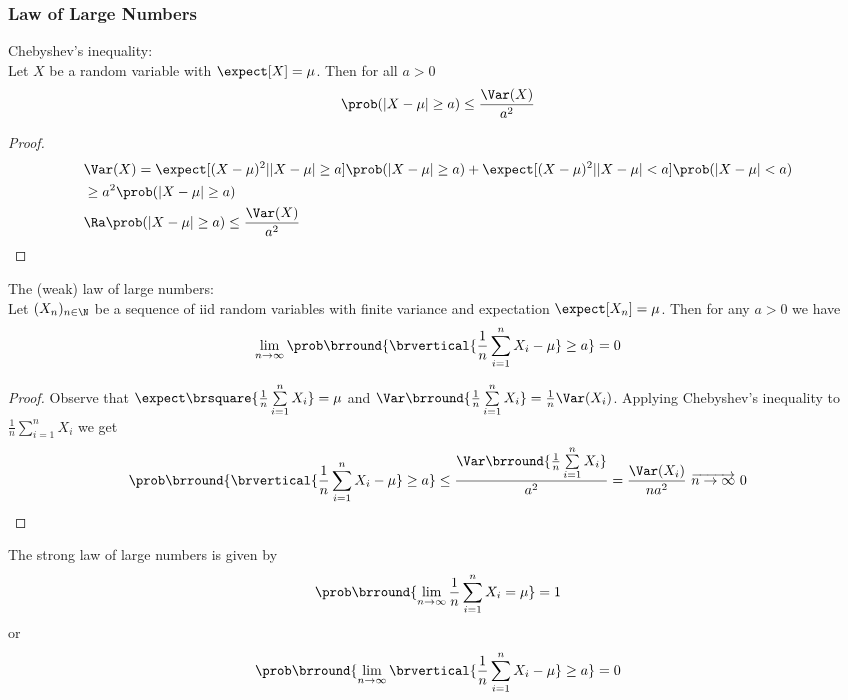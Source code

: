 \subsubsection{Law of Large Numbers}
Chebyshev's inequality:\\
Let $X$ be a random variable with $\expect[X]=\mu$. Then for all $a>0$
\[\prob(|X-\mu|\geq a)\leq\frac{\Var(X)}{a^2}\]
\begin{proof}
\begin{align*}
    &\Var(X)=\expect[(X-\mu)^2||X-\mu|\geq a]\prob(|X-\mu|\geq a) + \expect[(X-\mu)^2||X-\mu|<a]\prob(|X-\mu|<a)\\
    &\geq a^2\prob(|X-\mu|\geq a)\\
    &\Ra \prob(|X-\mu|\geq a)\leq\frac{\Var(X)}{a^2}
\end{align*}
\end{proof}
The (weak) law of large numbers:\\
Let $(X_n)_{n\in\N}$ be a sequence of iid random variables with finite variance and expectation $\expect[X_n]=\mu$. Then for any $a>0$ we have
\[\lim_{n\to\infty}\prob\brround{\brvertical{\frac{1}{n}\sum_{i=1}^n X_i-\mu}\geq a}=0\]
\begin{proof}
Observe that $\expect\brsquare{\frac{1}{n}\sum\limits_{i=1}^nX_i}=\mu$ and $\Var\brround{\frac{1}{n}\sum\limits_{i=1}^n X_i}=\frac{1}{n}\Var(X_i)$. Applying Chebyshev's inequality to $\frac{1}{n}\sum\limits_{i=1}^n X_i$ we get
\[\prob\brround{\brvertical{\frac{1}{n}\sum_{i=1}^n X_i-\mu}\geq a}\leq\frac{\Var\brround{\frac{1}{n}\sum\limits_{i=1}^n X_i}}{a^2}=\frac{\Var(X_i)}{na^2}\ \overrightarrow{n\to\infty}\ 0\]
\end{proof}
The strong law of large numbers is given by
\[\prob\brround{\lim_{n\to\infty}\frac{1}{n}\sum_{i=1}^n X_i=\mu}=1\]
or
\[\prob\brround{\lim_{n\to\infty}\brvertical{\frac{1}{n}\sum_{i=1}^n X_i-\mu}\geq a}=0\]
